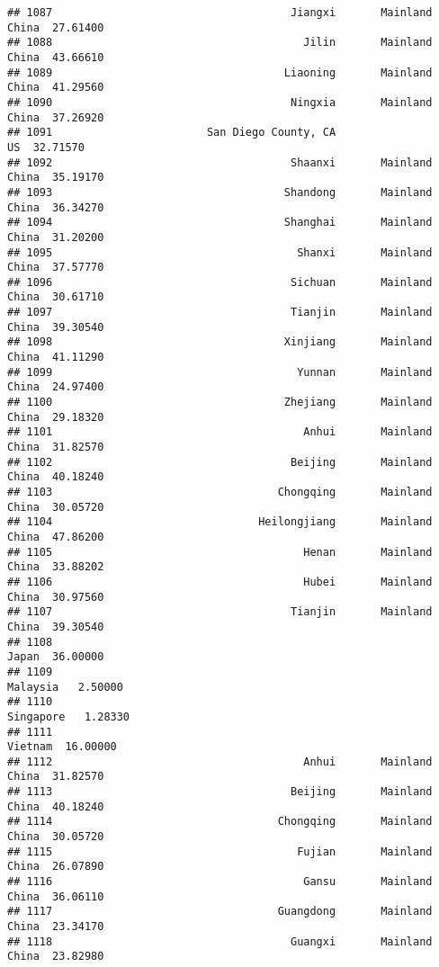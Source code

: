 \documentclass[
]{article}
\begin{document}
\begin{verbatim}
## 1087                                     Jiangxi       Mainland China  27.61400
## 1088                                       Jilin       Mainland China  43.66610
## 1089                                    Liaoning       Mainland China  41.29560
## 1090                                     Ningxia       Mainland China  37.26920
## 1091                        San Diego County, CA                   US  32.71570
## 1092                                     Shaanxi       Mainland China  35.19170
## 1093                                    Shandong       Mainland China  36.34270
## 1094                                    Shanghai       Mainland China  31.20200
## 1095                                      Shanxi       Mainland China  37.57770
## 1096                                     Sichuan       Mainland China  30.61710
## 1097                                     Tianjin       Mainland China  39.30540
## 1098                                    Xinjiang       Mainland China  41.11290
## 1099                                      Yunnan       Mainland China  24.97400
## 1100                                    Zhejiang       Mainland China  29.18320
## 1101                                       Anhui       Mainland China  31.82570
## 1102                                     Beijing       Mainland China  40.18240
## 1103                                   Chongqing       Mainland China  30.05720
## 1104                                Heilongjiang       Mainland China  47.86200
## 1105                                       Henan       Mainland China  33.88202
## 1106                                       Hubei       Mainland China  30.97560
## 1107                                     Tianjin       Mainland China  39.30540
## 1108                                                            Japan  36.00000
## 1109                                                         Malaysia   2.50000
## 1110                                                        Singapore   1.28330
## 1111                                                          Vietnam  16.00000
## 1112                                       Anhui       Mainland China  31.82570
## 1113                                     Beijing       Mainland China  40.18240
## 1114                                   Chongqing       Mainland China  30.05720
## 1115                                      Fujian       Mainland China  26.07890
## 1116                                       Gansu       Mainland China  36.06110
## 1117                                   Guangdong       Mainland China  23.34170
## 1118                                     Guangxi       Mainland China  23.82980

\end{verbatim}
\end{document}
